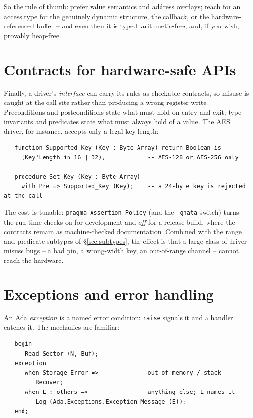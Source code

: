 So the rule of thumb: prefer value semantics and address overlays; reach for an
access type for the genuinely dynamic structure, the callback, or the
hardware-referenced buffer -- and even then it is typed, arithmetic-free, and, if
you wish, provably heap-free.

\section{Contracts for hardware-safe APIs}
\label{sec:contracts}

Finally, a driver's \emph{interface} can carry its rules as checkable contracts,
so misuse is caught at the call site rather than producing a wrong register write.
Preconditions and postconditions state what must hold on entry and exit; type
invariants and predicates state what must always hold of a value. The AES driver,
for instance, accepts only a legal key length:

\begin{lstlisting}
   function Supported_Key (Key : Byte_Array) return Boolean is
     (Key'Length in 16 | 32);            -- AES-128 or AES-256 only

   procedure Set_Key (Key : Byte_Array)
     with Pre => Supported_Key (Key);    -- a 24-byte key is rejected at the call
\end{lstlisting}

The cost is tunable: \texttt{pragma Assertion\_Policy} (and the \texttt{-gnata}
switch) turns the run-time checks on for development and \emph{off} for a release
build, where the contracts remain as machine-checked documentation. Combined with
the range and predicate subtypes of \S\ref{sec:subtypes}, the effect is that a
large class of driver-misuse bugs -- a bad pin, a wrong-width key, an
out-of-range channel -- cannot reach the hardware.

\section{Exceptions and error handling}
\label{sec:exceptions}

An Ada \emph{exception} is a named error condition: \texttt{raise} signals it and
a handler catches it. The mechanics are familiar:

\begin{lstlisting}
   begin
      Read_Sector (N, Buf);
   exception
      when Storage_Error =>           -- out of memory / stack
         Recover;
      when E : others =>              -- anything else; E names it
         Log (Ada.Exceptions.Exception_Message (E));
   end;
\end{lstlisting}

